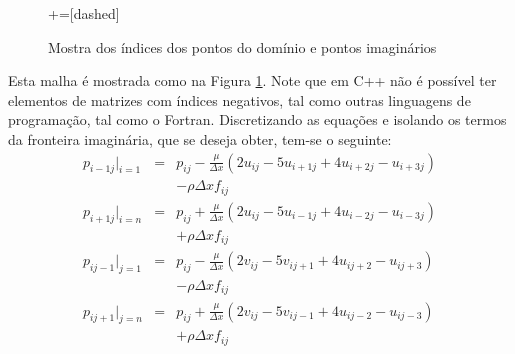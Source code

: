 \documentclass[journal]{IEEEtran}
\begin{document}
\begin{figure}
\centering
{}+=[dashed]%
\caption{Mostra dos índices dos pontos do domínio e pontos imaginários\label{uma_malha}}
\end{figure}
Esta malha é mostrada como na Figura \ref{uma_malha}. Note que em C++ não é possível ter elementos de matrizes com índices negativos, tal como outras linguagens de programação, tal como o Fortran. Discretizando as equações e isolando os termos da fronteira imaginária, que se deseja obter, tem-se o seguinte:
\begin{eqnarray}
p_{i-1j}|_{i=1}&=&p_{ij}-\frac{\mu}{\Delta x}\left(2u_{ij}-5u_{i+1j}+4u_{i+2j}-u_{i+3j}\right)\nonumber\\ & & -\rho\Delta x f_{ij}\\
p_{i+1j}|_{i=n}&=&p_{ij}+\frac{\mu}{\Delta x}\left(2u_{ij}-5u_{i-1j}+4u_{i-2j}-u_{i-3j}\right)\nonumber\\ & &+\rho\Delta x f_{ij}\\
p_{ij-1}|_{j=1}&=&p_{ij}-\frac{\mu}{\Delta x}\left(2v_{ij}-5v_{ij+1}+4u_{ij+2}-u_{ij+3}\right)\nonumber\\& &-\rho\Delta x f_{ij}\\
p_{ij+1}|_{j=n}&=&p_{ij}+\frac{\mu}{\Delta x}\left(2v_{ij}-5v_{ij-1}+4u_{ij-2}-u_{ij-3}\right)\nonumber\\& &+\rho\Delta x f_{ij}
\end{eqnarray}
\end{document}
